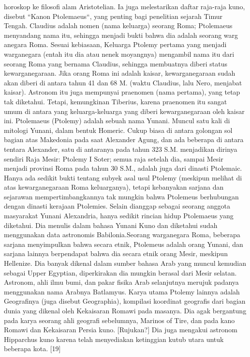     horoskop ke filosofi alam Aristotelian. Ia juga melestarikan daftar raja-raja kuno, disebut ``Kanon Ptolemaeus``, 
    yang penting bagi penelitian sejarah Timur Tengah.
    Claudius adalah nomen (nama keluarga) seorang Roma; Ptolemaeus menyandang nama itu, sehingga menjadi bukti bahwa dia adalah 
    seorang warg
    anegara Roma. Sesuai kebiasaan, Keluarga Ptolemy pertama yang menjadi warganegara (entah itu dia atau nenek moyangnya) 
    mengambil nama itu dari seorang Roma yang bernama Claudius, sehingga membuatnya diberi status kewarganegaraan. 
    Jika orang Roma ini adalah kaisar, kewarganegaraan sudah akan diberi di antara tahun 41 dan 68 M. 
    (waktu Claudius, lalu Nero, menjabat kaisar). Astronom itu juga mempunyai praenomen (nama pertama), yang tetap tak diketahui. 
    Tetapi, kemungkinan Tiberius, karena praenomen itu sangat umum di antara yang keluarga-keluarga yang diberi kewarganegaraan 
    oleh kaisar ini.
    Ptolemaeus (Ptolemy) adalah sebuah nama Yunani. Muncul satu kali di mitologi Yunani, dalam bentuk Homeric. 
    Cukup biasa di antara golongan sol bagian atas Makedonia pada saat Alexander Agung, dan ada beberapa di antara tentara Alexander,
    satu di antaranya pada tahun 323 S.M. menjadikan dirinya sendiri Raja Mesir: Ptolemy I Soter; semua raja setelah dia, 
    sampai Mesir menjadi provinsi Roma pada tahun 30 S.M., adalah juga dari dinasti Ptolemaic. Hanya ada sedikit bukti tentang subyek asal
    usul Ptolemy (meskipun melihat di atas kewarganegaraan Roma keluarganya), tetapi kebanyakan sarjana dan sejarawan mempertimbangkannya
    tak mungkin bahwa Ptolemeus berhubungan dengan dinasti kerajaan Ptolemies.
    Selain dianggap sebagai seorang anggota masyarakat Yunani Alexandria, hanya sedikit rincian hidup Ptolemaeus yang diketahui. 
    Dia menulis dalam bahasa Yunani Kuno dan diketahui sudah menggunakan data astronomis Babilonia.Seorang warganegara Roma, 
    beberapa sarjana menyimpulkan bahwa secara etnik, Ptolemeus adalah orang Yunani, dan sarjana lainnya berpendapat bahwa dia 
    secara etnik orang Mesir, meskipun Hellenize. Dia banyak dikenal dalam sumber bahasa Arab yang muncul kemudian sebagai Upper Egyptian,
    diperkirakan dia mungkin berasal dari Mesir selatan. Astronom, ahli ilmu bumi, dan pakar fisika Arab selanjutnya merujuk 
    padanya menggunakan nama Arabnya Batlamyus.
    Karya utama Ptolemy lainnya adalah Geografinya (juga disebut Geographia), kompilasi koordinat geografis dari bagian dunia yang 
    dikenal oleh Kekaisaran Romawi pada masanya. Dia agak bergantung pada karya seorang ahli geografi sebelumnya, Marinos of Tire,
    dan pada kano Romawi dan Kekaisaran Persia kuno. [Rujukan?] Dia juga mengakui astronom Hipparchus kuno karena telah menyediakan 
    ketinggian kutub utara untuk beberapa kota. [19]
  

